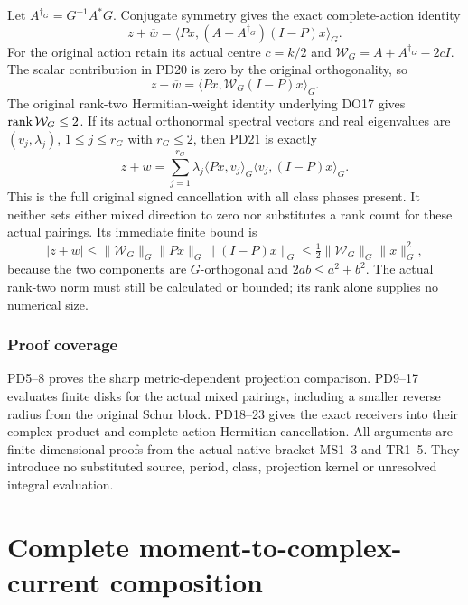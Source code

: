 Let $A^{\dagger_G}=G^{-1}A^*G$.  Conjugate symmetry gives the exact
complete-action identity
\[
 \boxed{z+\overline w
       =\langle Px,(A+A^{\dagger_G})(I-P)x\rangle_G.}            \tag{PD20}
\]
For the original action retain its actual centre $c=k/2$ and
$\mathcal W_G=A+A^{\dagger_G}-2cI$.  The scalar contribution in
PD20 is zero by the original orthogonality, so
\[
 z+\overline w=\langle Px,\mathcal W_G(I-P)x\rangle_G.           \tag{PD21}
\]
The original rank-two Hermitian-weight identity underlying DO17
gives $\operatorname{rank}\mathcal W_G\le2$.  If its actual orthonormal spectral
vectors and real eigenvalues are $(v_j,\lambda_j)$, $1\le j\le r_G$
with $r_G\le2$, then PD21 is exactly
\[
 z+\overline w
   =\sum_{j=1}^{r_G}\lambda_j
       \langle Px,v_j\rangle_G\langle v_j,(I-P)x\rangle_G.        \tag{PD22}
\]
This is the full original signed cancellation with all class phases
present.  It neither sets either mixed direction to zero nor
substitutes a rank count for these actual pairings.  Its immediate
finite bound is
\[
 |z+\overline w|
 \le\|\mathcal W_G\|_G\|Px\|_G\|(I-P)x\|_G
 \le\tfrac12\|\mathcal W_G\|_G\|x\|_G^2,                      \tag{PD23}
\]
because the two components are $G$-orthogonal and
$2ab\le a^2+b^2$.  The actual rank-two norm must still be
calculated or bounded; its rank alone supplies no numerical size.

\section{Proof coverage}
PD5--8 proves the sharp metric-dependent projection comparison.
PD9--17 evaluates finite disks for the actual mixed pairings,
including a smaller reverse radius from the original Schur block.
PD18--23 gives the exact receivers into their complex product and
complete-action Hermitian cancellation.  All arguments are
finite-dimensional proofs from the actual native bracket MS1--3
and TR1--5.  They introduce no substituted source, period, class,
projection kernel or unresolved integral evaluation.

\endgroup

\clearpage\begingroup
\part*{Complete moment-to-complex-current composition}
\newcommand{\mcompC}{\mathbb C}
\newcommand{\mcomptr}{\operatorname{tr}}



